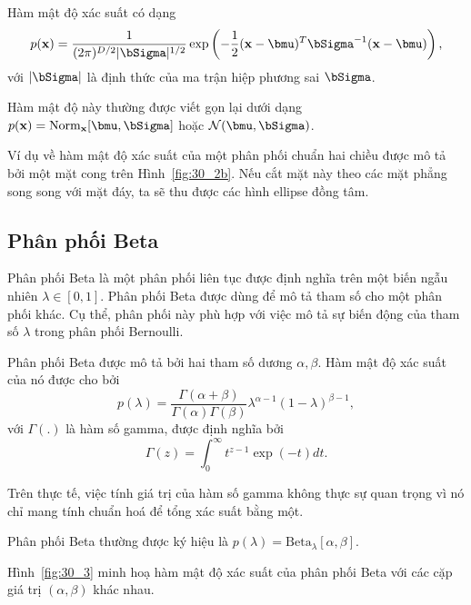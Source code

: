 \newpage 
Hàm mật độ xác suất có dạng
\begin{equation}
\label{eqn:30_33}
  p(\mathbf{x}) = \frac{1}{(2\pi)^{D/2} |\bSigma|^{1/2}} \exp \left(-\frac{1}{2}
  (\mathbf{x} - \bmu)^T \bSigma^{-1} (\mathbf{x} - \bmu)\right),
\end{equation}
với $|\bSigma|$ là định thức của ma trận hiệp phương sai $\bSigma$.

Hàm mật độ này thường được viết gọn lại dưới dạng 
  $p(\mathbf{x}) = \text{Norm}_{\mathbf{x}}[\bmu, \bSigma]$ hoặc
  $\mathcal{N}(\bmu, \bSigma)$.

Ví dụ về hàm mật độ xác suất của một phân phối chuẩn hai chiều được mô tả bởi
một mặt cong trên Hình~\ref{fig:30_2b}. Nếu cắt mặt này theo các mặt phẳng
song song với mặt đáy, ta sẽ thu được các hình ellipse đồng tâm.

\subsection{Phân phối Beta}
Phân phối Beta là một phân phối liên tục được định nghĩa trên một biến ngẫu
nhiên $\lambda \in [0, 1]$. Phân phối Beta được dùng để mô tả {tham số} cho một
phân phối khác. Cụ thể, phân phối này phù hợp với việc mô tả sự {biến động} của
tham số $\lambda$ trong phân phối Bernoulli.

Phân phối Beta được mô tả bởi hai tham số {dương} $\alpha, \beta$. Hàm
mật độ xác suất của nó được cho bởi
\begin{equation}
\label{eqn:30_34}
  p(\lambda) = \frac{\Gamma(\alpha + \beta)}{\Gamma(\alpha) \Gamma(\beta)} \lambda^{\alpha - 1} ( 1 - \lambda) ^{\beta - 1},
\end{equation}
với $\Gamma(.)$ là hàm số gamma, được định nghĩa bởi
\begin{equation}
  \Gamma(z) = \int_0^{\infty} t^{z-1}\exp(-t) dt.
\end{equation}

{Trên thực tế, việc tính giá trị của hàm số gamma không thực sự
quan trọng vì nó chỉ mang tính chuẩn hoá để tổng xác suất bằng một.}

Phân phối Beta thường được ký hiệu là $p(\lambda) =  \text{Beta}_{\lambda}[\alpha, \beta]$.

Hình~\ref{fig:30_3} minh hoạ hàm mật độ xác suất của phân phối Beta với các
cặp giá trị $(\alpha, \beta)$ khác nhau.

